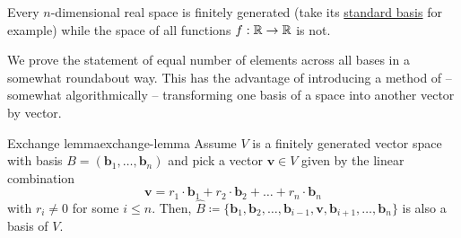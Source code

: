 \begin{example}{}{}
 Every $n$-dimensional real space is finitely generated (take its
 \hyperref[def:standard-basis]{standard basis} for example) while the space of
 all functions $f:\mathbb{R} \to \mathbb{R}$ is not.
\end{example}

We prove the statement of equal number of elements across all bases in a
somewhat roundabout way. This has the advantage of introducing a method of --
somewhat algorithmically -- transforming one basis of a space into another
vector by vector.

\begin{lemma}{Exchange lemma}{exchange-lemma}
 Assume $V$ is a finitely generated vector space with basis $B =
 (\mathbf{b}_1,\ldots,\mathbf{b}_n)$ and pick a vector $\mathbf{v} \in V$ given
 by the linear combination
 \[
  \mathbf{v} = r_1 \cdot \mathbf{b}_1 + r_2 \cdot \mathbf{b}_2 + \ldots + r_n
  \cdot \mathbf{b}_n
 \]
 with $r_i \neq 0$ for some $i \leq n$. Then, $\hat{B} \coloneqq
 \{\mathbf{b}_1,\mathbf{b}_2,\ldots,\mathbf{b}_{i-1},\mathbf{v},\mathbf{b}_{i+1},
 \ldots,\mathbf{b}_n\}$ is also a basis of $V$.
\end{lemma}
